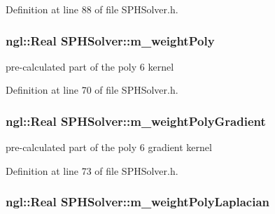Definition at line 88 of file SPHSolver.h.

\hypertarget{class_s_p_h_solver_ad5a368aa4d10c71bb1aafe84c9f9f838}{
\subsubsection[{m\_\-weightPoly}]{\setlength{\rightskip}{0pt plus 5cm}ngl::Real {\bf SPHSolver::m\_\-weightPoly}}}
\label{class_s_p_h_solver_ad5a368aa4d10c71bb1aafe84c9f9f838}


pre-\/calculated part of the poly 6 kernel 



Definition at line 70 of file SPHSolver.h.

\hypertarget{class_s_p_h_solver_a90434405f6296766d54626fe0582d664}{
\subsubsection[{m\_\-weightPolyGradient}]{\setlength{\rightskip}{0pt plus 5cm}ngl::Real {\bf SPHSolver::m\_\-weightPolyGradient}}}
\label{class_s_p_h_solver_a90434405f6296766d54626fe0582d664}


pre-\/calculated part of the poly 6 gradient kernel 



Definition at line 73 of file SPHSolver.h.

\hypertarget{class_s_p_h_solver_a76b956a2ddc98d9055438a0b57edba15}{
\subsubsection[{m\_\-weightPolyLaplacian}]{\setlength{\rightskip}{0pt plus 5cm}ngl::Real {\bf SPHSolver::m\_\-weightPolyLaplacian}}}
\label{class_s_p_h_solver_a76b956a2ddc98d9055438a0b57edba15}


